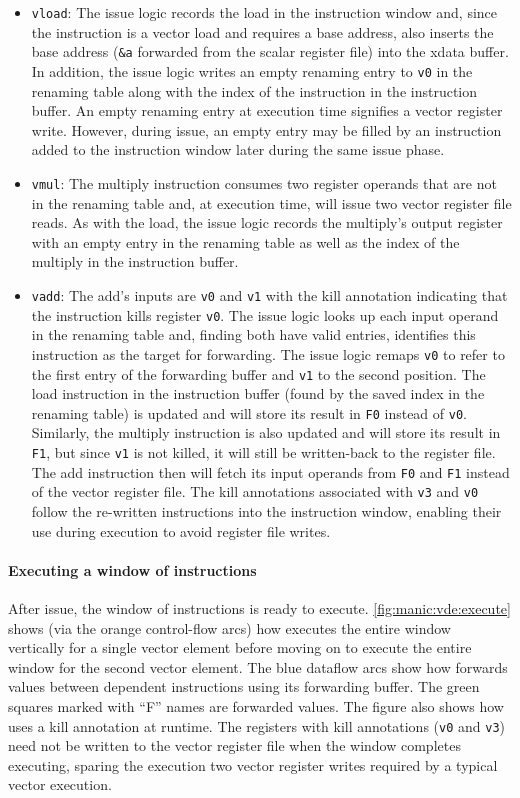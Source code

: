 \begin{itemize}
\item {\tt vload}:
The issue logic records the load in the instruction window and, since the instruction
is a vector load and requires a base address, also inserts the base address ({\tt \&a} forwarded from the scalar register file) into the xdata buffer.
% 
In addition, the issue logic writes an empty renaming entry to {\tt v0} in the renaming table along with the index of the instruction in the instruction buffer.
%
An empty renaming entry at execution time signifies a vector register write.
However, during issue, an empty entry may be filled by an instruction added to
the instruction window later during the same issue phase.
\item {\tt vmul}: The multiply instruction consumes two register operands that are not in the renaming table and, at execution time, will issue
two vector register file reads.
%
As with the load, the issue logic records the multiply's output register with 
an empty entry in the renaming table as well as the index of the multiply in the
instruction buffer.
\item {\tt vadd}:
The add's inputs are {\tt v0} and {\tt v1} with the kill annotation indicating
that the instruction kills register {\tt v0}.
%
The issue logic looks up each input operand in the renaming table and, finding 
both have valid entries, identifies this instruction as the target for forwarding.
%
The issue logic remaps {\tt v0} to refer to the first entry of the forwarding
buffer and {\tt v1} to the second position. 
%
The load instruction in the instruction buffer (found by the saved index in the renaming table) 
is updated and will store its result in {\tt F0} instead of {\tt v0}.
%
Similarly, the multiply instruction is also updated and will store its result in {\tt F1}, but since {\tt v1} is not killed, it will still be written-back to the register file. 
%
The add instruction then will fetch its input operands from {\tt F0}
and {\tt F1} instead of the vector register file.
%
The kill annotations associated with {\tt v3} and {\tt v0} follow the re-written
instructions into the instruction window, enabling their use during execution
to avoid register file writes.
\end{itemize}

\paragraph{Executing a window of instructions}
After issue, the window of instructions is ready to execute.
\autoref{fig:manic:vde:execute} shows (via the orange control-flow arcs) how \manic
executes the entire window vertically for a single vector element before moving
on to execute the entire window for the second vector element.
%
The blue dataflow arcs show how \manic forwards values between dependent
instructions using its forwarding buffer.  The green squares marked with ``F'' names
are forwarded values.
%
The figure also shows how \manic uses a kill annotation at runtime.
%
The registers with kill annotations ({\tt v0} and {\tt v3}) need not be written
to the vector register file when the window completes executing, sparing the
execution two vector register writes required by a typical vector execution. 

